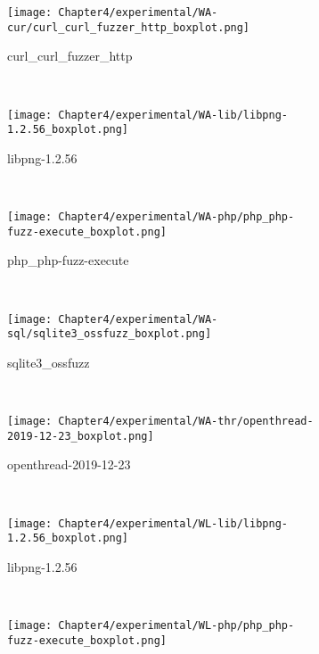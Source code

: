 \begin{figure}[!t]
    \centering
    \begin{subfigure}[t]{0.3\textwidth}
        \centering
        \texttt{[image: Chapter4/experimental/WA-cur/curl\_curl\_fuzzer\_http\_boxplot.png]}
        \vspace*{-5mm}
        \label{wa:curl}
        \caption{curl\_curl\_fuzzer\_http}
    \end{subfigure}
    ~
    \begin{subfigure}[t]{0.3\textwidth}
        \centering
        \texttt{[image: Chapter4/experimental/WA-lib/libpng-1.2.56\_boxplot.png]}
        \vspace*{-5mm}
        \label{wa:libpng}
        \caption{libpng-1.2.56}
    \end{subfigure}
    ~
    \begin{subfigure}[t]{0.3\textwidth}
        \centering
        \texttt{[image: Chapter4/experimental/WA-php/php\_php-fuzz-execute\_boxplot.png]}
        \vspace*{-5mm}
        \label{wa:php}
        \caption{php\_php-fuzz-execute}
    \end{subfigure}
    ~
    \begin{subfigure}[t]{0.3\textwidth}
        \centering
        \texttt{[image: Chapter4/experimental/WA-sql/sqlite3\_ossfuzz\_boxplot.png]}
        \vspace*{-5mm}
        \label{wa:sql}
        \caption{sqlite3\_ossfuzz}
    \end{subfigure}
    ~
    \begin{subfigure}[t]{0.3\textwidth}
        \centering
        \texttt{[image: Chapter4/experimental/WA-thr/openthread-2019-12-23\_boxplot.png]}
        \vspace*{-5mm}
        \label{wa:openthread}
        \caption{openthread-2019-12-23}
    \end{subfigure}
    ~
    \begin{subfigure}[t]{0.3\textwidth}
        \centering
        \texttt{[image: Chapter4/experimental/WL-lib/libpng-1.2.56\_boxplot.png]}
        \vspace*{-5mm}
        \label{wl:lib}
        \caption{libpng-1.2.56}
    \end{subfigure}
    ~
    \begin{subfigure}[t]{0.3\textwidth}
        \centering
        \texttt{[image: Chapter4/experimental/WL-php/php\_php-fuzz-execute\_boxplot.png]}

\end{subfigure}
\end{figure}
